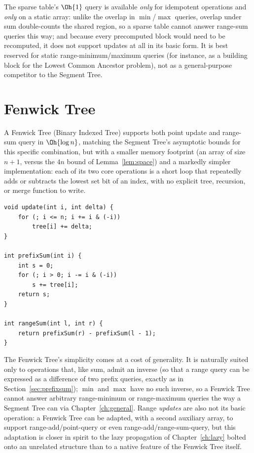 \begin{pitfall}
The sparse table's $\Oh{1}$ query is available \emph{only} for idempotent operations and \emph{only} on a static array: unlike the overlap in $\min$/$\max$ queries, overlap under sum double-counts the shared region, so a sparse table cannot answer range-sum queries this way; and because every precomputed block would need to be recomputed, it does not support updates at all in its basic form. It is best reserved for static range-minimum/maximum queries (for instance, as a building block for the Lowest Common Ancestor problem), not as a general-purpose competitor to the Segment Tree.
\end{pitfall}

\section{Fenwick Tree}
\label{sec:fenwick}
A Fenwick Tree (Binary Indexed Tree) supports both point update and range-sum query in $\Oh{\log n}$, matching the Segment Tree's asymptotic bounds for this specific combination, but with a smaller memory footprint (an array of size $n{+}1$, versus the $4n$ bound of Lemma~\ref{lem:space}) and a markedly simpler implementation: each of its two core operations is a short loop that repeatedly adds or subtracts the lowest set bit of an index, with no explicit tree, recursion, or merge function to write.

\begin{table}[H]
\centering
\caption{Point update and range-sum query implemented on a Fenwick Tree; \texttt{tree} is 1-indexed and initialized to all zeros.}
\label{lst:fenwick-ref}
\begin{lstlisting}[style=cpp]
void update(int i, int delta) {
    for (; i <= n; i += i & (-i))
        tree[i] += delta;
}

int prefixSum(int i) {
    int s = 0;
    for (; i > 0; i -= i & (-i))
        s += tree[i];
    return s;
}

int rangeSum(int l, int r) {
    return prefixSum(r) - prefixSum(l - 1);
}
\end{lstlisting}
\end{table}

The Fenwick Tree's simplicity comes at a cost of generality. It is naturally suited only to operations that, like sum, admit an inverse (so that a range query can be expressed as a difference of two prefix queries, exactly as in Section~\ref{sec:prefixsum}); $\min$ and $\max$ have no such inverse, so a Fenwick Tree cannot answer arbitrary range-minimum or range-maximum queries the way a Segment Tree can via Chapter~\ref{ch:general}. Range \emph{updates} are also not its basic operation: a Fenwick Tree can be adapted, with a second auxiliary array, to support range-add/point-query or even range-add/range-sum-query, but this adaptation is closer in spirit to the lazy propagation of Chapter~\ref{ch:lazy} bolted onto an unrelated structure than to a native feature of the Fenwick Tree itself.

